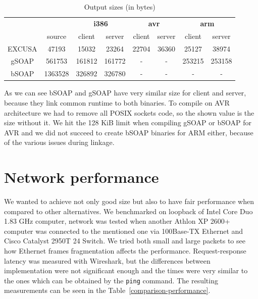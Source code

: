 \documentclass[12pt,notitlepage]{report}
\begin{document}
\begin{table}[htb]
\begin{center}
\tabcolsep=6pt
\renewcommand{\arraystretch}{1.3}
\begin{tabular}{|c|c|c|c|c|c|c|c|}
\cline{3-8}
\multicolumn{2}{c|}{} & \multicolumn{2}{c|}{\textbf{i386}} & \multicolumn{2}{c|}{\textbf{avr}} & \multicolumn{2}{c|}{\textbf{arm}}\\ \cline{2-8}
\multicolumn{1}{c|}{} & source & client & server & client & server & client & server\\ \hline
EXCUSA & 47193 & 15032 & 23264 & 22704 & 36360 & 25127 & 38974\\ \hline
gSOAP & 561753 & 161812 & 161772 & - & - & 253215 & 253158\\ \hline
bSOAP & 1363528 & 326892 & 326780 & - & - & - & -\\ \hline
\end{tabular}
\end{center}
\caption{Output sizes (in bytes)}
\label{comparison-sizes}
\end{table}

As we can see bSOAP and gSOAP have very similar size for client and server, because they link common runtime to both binaries. To compile on AVR architecture we had to remove all POSIX sockets code, so the shown value is the size without it. We hit the 128 KiB limit when compiling gSOAP or bSOAP for AVR and we did not succeed to create bSOAP binaries for ARM either, because of the various issues during linkage.

\section{Network performance}
\label{results-perf}

We wanted to achieve not only good size but also to have fair performance when compared to other alternatives. We benchmarked on loopback of Intel Core Duo 1.83 GHz computer, network was tested when another Athlon XP 2600+ computer was connected to the mentioned one via 100Base-TX Ethernet and Cisco Catalyst 2950T 24 Switch. We tried both small and large packets to see how Ethernet frames fragmentation affects the performance. Request-response latency was measured with Wireshark, but the differences between implementation were not significant enough and the times were very similar to the ones which can be obtained by the \texttt{ping} command. The resulting measurements can be seen in the Table~\ref{comparison-performance}.
\end{document}
